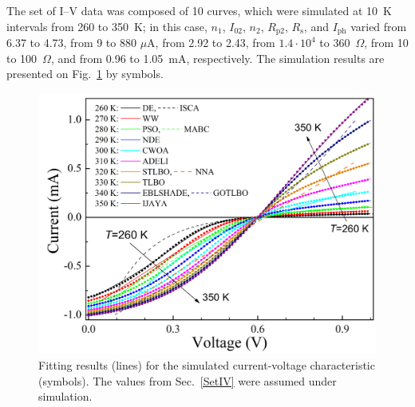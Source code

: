 \documentclass[a4paper,fleqn]{cas-dc}
\begin{document}
The set of I–V data was composed of 10 curves,
which were simulated at 10~K intervals from 260 to 350~K;
in this case,
$n_1$,
$I_{02}$,
$n_2$,
$R_\mathrm{p2}$,
$R_\mathrm{s}$,
and $I_\mathrm{ph}$
varied
from 6.37 to 4.73,
from 9 to 880 $\mu$A,
from 2.92 to 2.43,
from $1.4\cdot10^4$ to 360~$\Omega$,
from 10 to 100~$\Omega$,
and from 0.96 to 1.05~mA, respectively.
The simulation results are presented on Fig.~\ref{figSetIV} by symbols.
\begin{figure}[]
	\centering
		\includegraphics[width=1.0\columnwidth]{IVset}
	  \caption{Fitting results (lines) for the simulated current-voltage characteristic (symbols).
             The values from  Sec.~\ref{SetIV} were assumed under simulation.}\label{figSetIV}
\end{figure}
\end{document}
